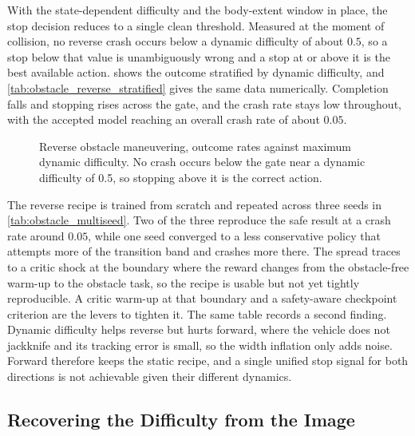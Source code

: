 With the state-dependent difficulty and the body-extent window in place, the stop decision reduces to a single clean threshold. Measured at the moment of collision, no reverse crash occurs below a dynamic difficulty of about $0.5$, so a stop below that value is unambiguously wrong and a stop at or above it is the best available action.  shows the outcome stratified by dynamic difficulty, and \cref{tab:obstacle_reverse_stratified} gives the same data numerically. Completion falls and stopping rises across the gate, and the crash rate stays low throughout, with the accepted model reaching an overall crash rate of about $0.05$.

\begin{figure}[H]
    \centering
    \caption{Reverse obstacle maneuvering, outcome rates against maximum dynamic difficulty. No crash occurs below the gate near a dynamic difficulty of 0.5, so stopping above it is the correct action.}
    \label{fig:reverse_obstacle_gate}
\end{figure}



The reverse recipe is trained from scratch and repeated across three seeds in \cref{tab:obstacle_multiseed}. Two of the three reproduce the safe result at a crash rate around $0.05$, while one seed converged to a less conservative policy that attempts more of the transition band and crashes more there. The spread traces to a critic shock at the boundary where the reward changes from the obstacle-free warm-up to the obstacle task, so the recipe is usable but not yet tightly reproducible. A critic warm-up at that boundary and a safety-aware checkpoint criterion are the levers to tighten it. The same table records a second finding. Dynamic difficulty helps reverse but hurts forward, where the vehicle does not jackknife and its tracking error is small, so the width inflation only adds noise. Forward therefore keeps the static recipe, and a single unified stop signal for both directions is not achievable given their different dynamics.



\subsection{Recovering the Difficulty from the Image}

